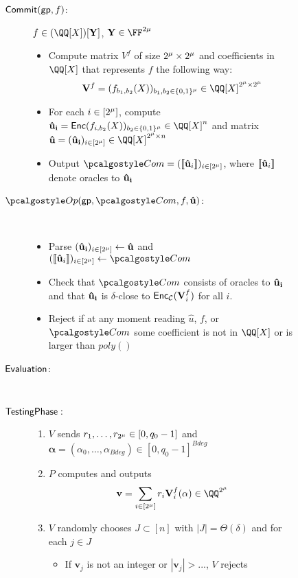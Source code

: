 \documentclass[11pt,letterpaper,usenames,dvipsnames]{article}
\begin{document}
\begin{figure}[H]
	\begin{framed}
		\begin{description}
			\item[$\mathsf{Commit}(\mathsf{gp}, f)$:] $f\in\polyspace$, $\vec Y\in\FF^{2\mu}$ 
				\begin{itemize}
					\item Compute matrix $V^f$ of size $2^\mu\times2^\mu$ and coefficients in $\QQ[X]$ that represents $f$ the following way:
						$$\mathbf V^f=(f_{b_1, b_2}(X))_{b_1, b_2 \in \{0,1\}^\mu}\in \QQ[X]^{\size\times\size}$$
					\item For each $i\in[2^\mu]$, compute
					 $\vectorUi=\encode(f_{i,b_2}(X))_{b_2\in\{0,1\}^\mu}\in\QQ[X]^n$ and matrix 
					 $\matrixU=(\vectorUi)_{i\in [\size]}\in\QQ[X]^{\size\times n}$
					\item Output $\com=(\oracleUi)_{i\in[\size]}$, where $\llbracket\mathbf{\hat{u}}_i\rrbracket$ denote oracles to $\mathbf{\hat{u}_i}$
				\end{itemize}
			\item[$\open(\gp, \com, f, \matrixU)$:] \ \
				\begin{itemize}
					\item Parse $(\mathbf{\hat{u}_i})_{i\in[2^\mu]}\gets\mathbf{\hat{u}}$ and $(\oracleUi)_{i\in[\size]}\gets\com$
					\item Check that $\com$ consists of oracles to $\mathbf{\hat{u}_i}$ and that $\mathbf{\hat{u}_i}$ is $\delta$-close to $\mathsf{Enc}_{\mathcal{C}}(\mathbf{V}^f_i)$ for all $i$. 
					\item Reject if at any moment reading $\hat{u}$, $f$, or $\com$ some coefficient is not in $\QQ[X]$ or is larger than $poly()$
				\end{itemize}		
		\item[$\mathsf{Evaluation}$:] \
		\item[$\mathsf{Testing Phase}:$]
				\begin{enumerate}
					\item $V$ sends $r_1, \ldots, r_{2^\mu}\in[0, q_0-1]$ and $\mathbf \alpha=(\alpha_0, \ldots, \alpha_{Bdeg})\in[0, q_0-1]^{Bdeg}$
					\item $P$ computes and outputs 
					$$\mathbf{v}=\sum_{i\in[\size]}r_i\matrixV^f_i(\mathbf{\alpha})\in \QQ^{\size}$$
					\item $V$ randomly chooses $J\subset[n]$ with $|J|=\Theta(\delta)$ and for each $j\in J$
						\begin{itemize}
							\item If $\mathbf v_j$ is not an integer or $|\mathbf v_j|>...$, $V$ rejects

\end{itemize}
\end{enumerate}
\end{description}
\end{framed}
\end{figure}
\end{document}
